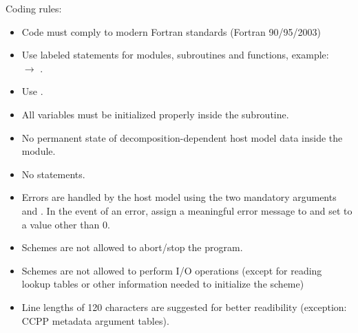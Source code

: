 Coding rules:
\begin{itemize}
\item Code must comply to modern Fortran standards (Fortran 90/95/2003)
\item Use labeled  statements for modules, subroutines and functions, example:\\
 $\rightarrow$ .
\item Use .
\item All  variables must be initialized properly inside the subroutine.
\item No permanent state of decomposition-dependent host model data inside the module.
\item No  statements.
\item Errors are handled by the host model using the two mandatory arguments  and . In the event of an error, assign a meaningful error message to  and set  to a value other than 0.
\item Schemes are not allowed to abort/stop the program.
\item Schemes are not allowed to perform I/O operations (except for reading lookup tables or other information needed to initialize the scheme)
\item Line lengths of 120 characters are suggested for better readibility (exception: CCPP metadata argument tables).
\end{itemize}

